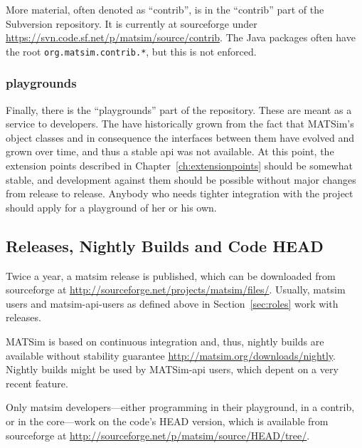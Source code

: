 More material, often denoted as ``contrib'', is in the ``contrib'' part of the Subversion repository.  It is currently at \gls{sourceforge} under \url{https://svn.code.sf.net/p/matsim/source/contrib}.  The Java packages often have the root \lstinline{org.matsim.contrib.*}, but this is not enforced.



\subsubsection{playgrounds}

Finally, there is the ``playgrounds'' part of the repository.  These are meant as a service to developers.  The have historically grown from the fact that MATSim's object classes and in consequence the interfaces between them have evolved and grown over time, and thus a stable \acrshort{api} was not available.  At this point, the extension points described in Chapter~\ref{ch:extensionpoints} should be somewhat stable, and development against them should be possible without major changes from release to release.  Anybody who needs tighter integration with the project should apply for a playground of her or his own.  


\subsection{Releases, Nightly Builds and Code HEAD}
\label{sec:releases-builds}

Twice a year, a \gls{matsim} release is published, which can be downloaded from \gls{sourceforge} at \url{http://sourceforge.net/projects/matsim/files/}. Usually, \gls{matsim} users and \gls{matsim}-\gls{api}-users as defined above in Section~\ref{sec:roles} work with releases. 

MATSim is based on continuous integration and, thus, nightly builds are available without stability guarantee \url{http://matsim.org/downloads/nightly}. Nightly builds might be used by MATSim-\gls{api} users, which depent on a very recent feature. 

Only \gls{matsim} developers---either programming in their playground, in a contrib, or in the core---work on the code's HEAD version, which is available from \gls{sourceforge} at \url{http://sourceforge.net/p/matsim/source/HEAD/tree/}.

